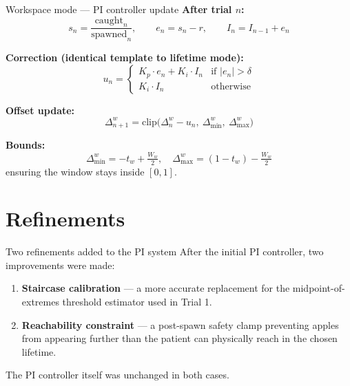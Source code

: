 \documentclass[10pt,aspectratio=169]{beamer}
\newcommand{\target}{r}
\newcommand{\obs}{s_n}
\newcommand{\err}{e_n}
\newcommand{\Kp}{K_p}
\newcommand{\Ki}{K_i}
\newcommand{\Iaccum}{I_n}
\newcommand{\dband}{\delta}
\begin{document}
\begin{frame}{Workspace mode --- PI controller update}
\textbf{After trial $n$:}
\[
\obs = \frac{\text{caught}_n}{\text{spawned}_n}, \qquad \err = \obs - \target, \qquad \Iaccum = I_{n-1} + \err
\]

\textbf{Correction (identical template to lifetime mode):}
\[
u_n =
\begin{cases}
\Kp \cdot \err + \Ki \cdot \Iaccum & \text{if } |\err| > \dband \\[4pt]
\Ki \cdot \Iaccum & \text{otherwise}
\end{cases}
\]

\textbf{Offset update:}
\[
\Delta_{n+1}^w = \mathrm{clip}\bigl(\Delta_n^w - u_n,\ \Delta_{\min}^w,\ \Delta_{\max}^w\bigr)
\]

\textbf{Bounds:}
\[
\Delta_{\min}^w = -t_w + \tfrac{W_w}{2}, \quad \Delta_{\max}^w = (1 - t_w) - \tfrac{W_w}{2}
\]
ensuring the window stays inside $[0, 1]$.
\end{frame}

\section{Refinements}

\begin{frame}{Two refinements added to the PI system}
After the initial PI controller, two improvements were made:
\begin{enumerate}
    \item \textbf{Staircase calibration}  --- a more accurate replacement for the midpoint-of-extremes threshold estimator used in Trial 1.
    \item \textbf{Reachability constraint}  --- a post-spawn safety clamp preventing apples from appearing further than the patient can physically reach in the chosen lifetime.
\end{enumerate}
The PI controller itself was unchanged in both cases.
\end{frame}
\end{document}
